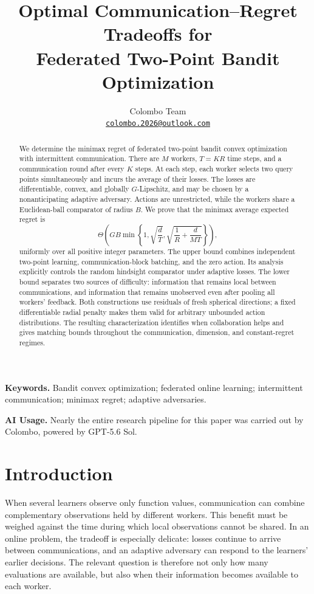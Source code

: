 \documentclass[11pt,a4paper]{article}
\title{Optimal Communication--Regret Tradeoffs for\\
Federated Two-Point Bandit Optimization}
\author{Colombo Team\\[3pt]
  \small\href{mailto:colombo.2026@outlook.com}{\texttt{colombo.2026@outlook.com}}}
\date{}
\numberwithin{equation}{section}
\theoremstyle{remark}
\begin{document}
\maketitle

\begin{abstract}
We determine the minimax regret of federated two-point bandit convex
optimization with intermittent communication. There are $M$ workers,
$T=KR$ time steps, and a communication round after every $K$ steps.
At each step, each worker selects two query points simultaneously and
incurs the average of their losses. The losses are differentiable,
convex, and globally $G$-Lipschitz, and may be chosen by a nonanticipating
adaptive adversary. Actions are unrestricted, while the workers share a
Euclidean-ball comparator of radius $B$. We prove that the minimax
average expected regret is
\[
\Theta\!\left(GB\min\left\{1,\sqrt{\frac dT},
                 \sqrt{\frac1R+\frac d{MT}}\right\}\right),
\]
uniformly over all positive integer parameters. The upper bound combines
independent two-point learning, communication-block batching, and the
zero action. Its analysis explicitly controls the random hindsight
comparator under adaptive losses. The lower bound separates two sources
of difficulty: information that remains local between communications,
and information that remains unobserved even after pooling all workers'
feedback. Both constructions use residuals of fresh spherical directions;
a fixed differentiable radial penalty makes them valid for arbitrary
unbounded action distributions. The resulting characterization identifies
when collaboration helps and gives matching bounds throughout the
communication, dimension, and constant-regret regimes.
\end{abstract}

\noindent\textbf{Keywords.}
Bandit convex optimization; federated online learning; intermittent
communication; minimax regret; adaptive adversaries.

\begin{samepage}
\noindent\textbf{AI Usage.}
Nearly the entire research pipeline for this paper was carried out by
Colombo, powered by GPT-5.6 Sol.
\par
\end{samepage}

\section{Introduction}
\label{sec:intro}

When several learners observe only function values, communication can
combine complementary observations held by different workers. This benefit
must be weighed against the time during which local observations cannot
be shared. In an online problem, the tradeoff is especially delicate:
losses continue to arrive between communications, and an adaptive
adversary can respond to the learners' earlier decisions. The relevant
question is therefore not only how many evaluations are available, but
also when their information becomes available to each worker.
\end{document}
